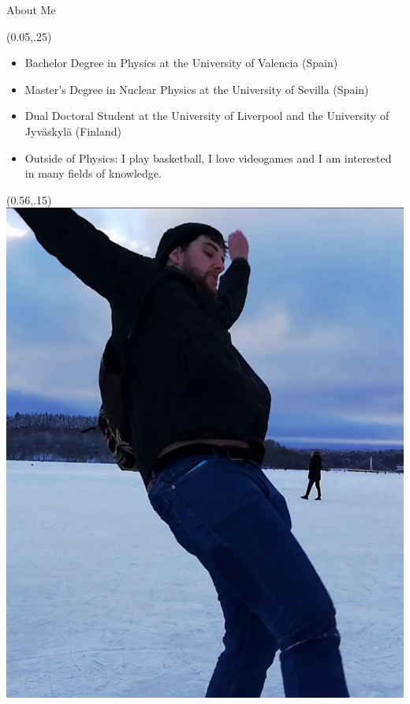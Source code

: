 \documentclass{beamer}
\begin{document}
\begin{frame}{About Me}
    \begin{textblock*}{0.5\paperwidth}(0.05\paperwidth,.25\paperheight)
        \begin{itemize}
            \item Bachelor Degree in Physics at the University of Valencia (Spain)
            \item Master's Degree in Nuclear Physics at the University of Sevilla (Spain)
            \item Dual Doctoral Student at the University of Liverpool and the University of Jyväskylä (Finland)
            \item \alert{Outside of Physics}: I play basketball, I love videogames and I am interested in many fields of knowledge.
        \end{itemize}
    \end{textblock*}
    \begin{textblock*}{0.3\paperwidth}(0.56\paperwidth,.15\paperheight)
        \includegraphics[scale=0.3]{assets/foto}
    \end{textblock*}
\end{frame}
\end{document}
